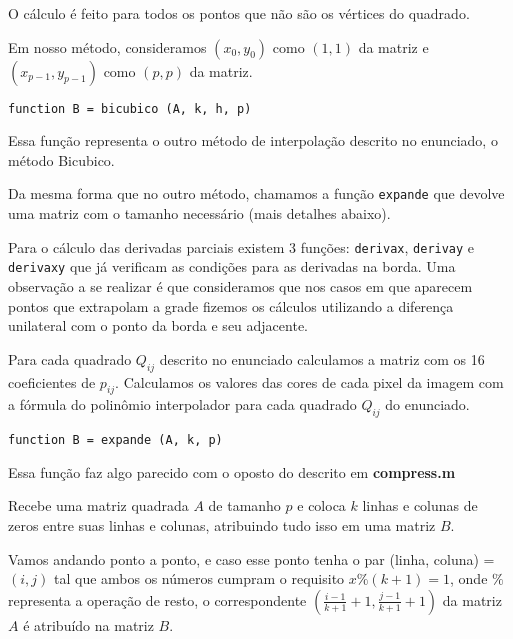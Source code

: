 \documentclass[12pt,letterpaper]{article}
\begin{document}
	O cálculo é feito para todos os pontos que não são os vértices do quadrado. 
	
	Em nosso método, consideramos $(x_0, y_0)$ como $(1, 1)$ da matriz e $(x_{p-1}, y_{p-1})$ como $(p, p)$ da matriz.
	 
	\begin{center}
		\texttt{function B = bicubico (A, k, h, p)}
	\end{center}

	Essa função representa o outro método de interpolação descrito no enunciado, o método Bicubico.

	Da mesma forma que no outro método, chamamos a função \texttt{expande} que devolve uma matriz com o tamanho necessário (mais detalhes abaixo).

	Para o cálculo das derivadas parciais existem 3 funções: \texttt{derivax}, \texttt{derivay} e \texttt{derivaxy} que já verificam as condições para as derivadas na borda. Uma observação a se realizar é que consideramos que nos casos em que aparecem pontos que extrapolam a grade fizemos os cálculos utilizando a diferença unilateral com o ponto da borda e seu adjacente.

	Para cada quadrado $Q_{ij}$ descrito no enunciado calculamos a matriz com os 16 coeficientes de $p_{ij}$. Calculamos os valores das cores de cada pixel da imagem com a fórmula do polinômio interpolador para cada quadrado $Q_{ij}$ do enunciado.

	\begin{center}
		\texttt{function B = expande (A, k, p)}
	\end{center}
	
	Essa função faz algo parecido com o oposto do descrito em \textbf{compress.m}
	
	Recebe uma matriz quadrada $A$ de tamanho $p$ e coloca $k$ linhas e colunas de zeros entre suas linhas e colunas, atribuindo tudo isso em uma matriz $B$. 
	
	Vamos andando ponto a ponto, e caso esse ponto tenha o par (linha, coluna) = $(i, j)$ tal que ambos os números cumpram o requisito $x\%(k+1)=1$, onde $\%$ representa a operação de resto, o correspondente $(\frac{i-1}{k+1}+1, \frac{j-1}{k+1}+1)$ da matriz $A$ é atribuído na matriz $B$.
	
	
\end{document}
